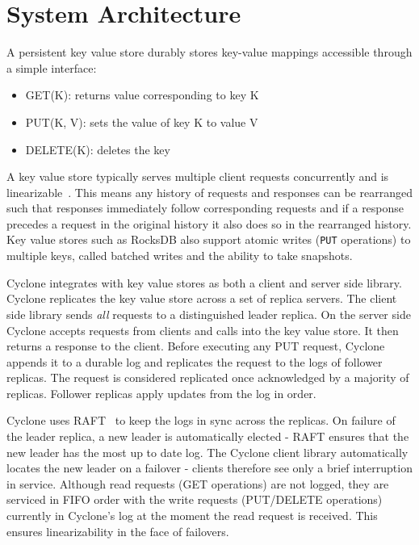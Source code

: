 \documentclass[pageno]{jpaper}
\begin{document}
\section{System Architecture}
\label{sec:sysarch}
A persistent key value store durably stores key-value mappings accessible through a
simple interface:

\begin{itemize}
\item GET(K): returns value corresponding to key K
\item PUT(K, V): sets the value of key K to value V
\item DELETE(K): deletes the key
\end{itemize}

A key value store typically serves multiple client requests concurrently and is
linearizable~\cite{linearizability}. This means any history of requests and
responses can be rearranged such that responses immediately follow corresponding
requests and if a response precedes a request in the original history it also
does so in the rearranged history. Key value stores such as RocksDB also
support atomic writes ({\tt PUT} operations) to multiple keys, called batched
writes and the ability to take snapshots.

Cyclone integrates with key value stores as both a client and server side
library. Cyclone replicates the key value store across a set of replica
servers. The client side library sends \emph{all} requests to a distinguished
leader replica.  On the server side Cyclone accepts requests from clients and calls
into the key value store. It then returns a response to the client. Before
executing any PUT request, Cyclone appends it to a durable log and replicates
the request to the logs of follower replicas. The request is considered
replicated once acknowledged by a majority of replicas. Follower replicas apply
updates from the log in order.

Cyclone uses RAFT~\cite{raft} to keep the logs in sync across the replicas. On
failure of the leader replica, a new leader is automatically elected - RAFT
ensures that the new leader has the most up to date log. The Cyclone client
library automatically locates the new leader on a failover - clients therefore
see only a brief interruption in service. Although read requests (GET
operations) are not logged, they are serviced in FIFO order with the write
requests (PUT/DELETE operations) currently in Cyclone's log at the moment the
read request is received. This ensures linearizability in the face of failovers.
\end{document}
